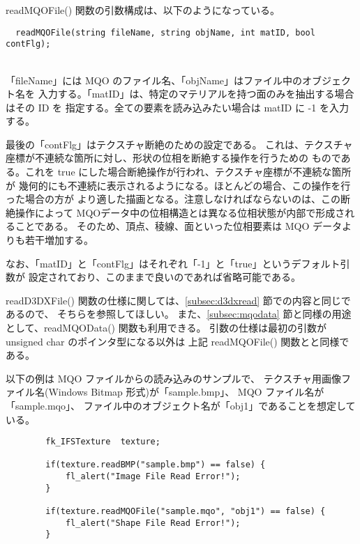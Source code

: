readMQOFile() 関数の引数構成は、以下のようになっている。
\\
\begin{screen}
\begin{verbatim}
  readMQOFile(string fileName, string objName, int matID, bool contFlg);
\end{verbatim}
\end{screen}
~ \\
「fileName」には MQO のファイル名、「objName」はファイル中のオブジェクト名を
入力する。「matID」は、特定のマテリアルを持つ面のみを抽出する場合はその ID を
指定する。全ての要素を読み込みたい場合は matID に -1 を入力する。

最後の「contFlg」はテクスチャ断絶のための設定である。
これは、テクスチャ座標が不連続な箇所に対し、形状の位相を断絶する操作を行うための
ものである。これを true にした場合断絶操作が行われ、テクスチャ座標が不連続な箇所が
幾何的にも不連続に表示されるようになる。ほとんどの場合、この操作を行った場合の方が
より適した描画となる。注意しなければならないのは、この断絶操作によって
MQOデータ中の位相構造とは異なる位相状態が内部で形成されることである。
そのため、頂点、稜線、面といった位相要素は MQO データよりも若干増加する。

なお、「matID」と「contFlg」はそれぞれ「-1」と「true」というデフォルト引数が
設定されており、このままで良いのであれば省略可能である。

readD3DXFile() 関数の仕様に関しては、\ref{subsec:d3dxread} 節での内容と同じであるので、
そちらを参照してほしい。
また、\ref{subsec:mqodata} 節と同様の用途として、readMQOData() 関数も利用できる。
引数の仕様は最初の引数が unsigned char のポインタ型になる以外は
上記 readMQOFile() 関数とと同様である。

以下の例は MQO ファイルからの読み込みのサンプルで、
テクスチャ用画像ファイル名(Windows Bitmap 形式)が「sample.bmp」、
MQO ファイル名が「sample.mqo」、
ファイル中のオブジェクト名が「obj1」であることを想定している。
\\
\begin{breakbox}
\begin{verbatim}
        fk_IFSTexture  texture;

        if(texture.readBMP("sample.bmp") == false) {
            fl_alert("Image File Read Error!");
        }

        if(texture.readMQOFile("sample.mqo", "obj1") == false) {
            fl_alert("Shape File Read Error!");
        }
\end{verbatim}
\end{breakbox} ~

